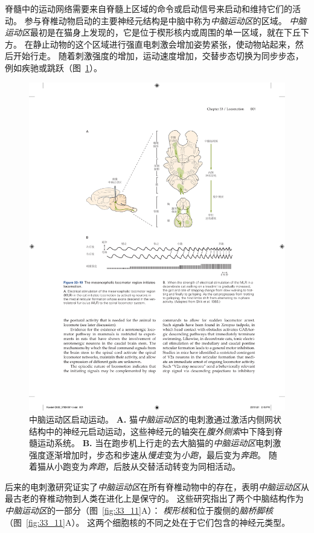 脊髓中的运动网络需要来自脊髓上区域的命令或启动信号来启动和维持它们的活动。
参与脊椎动物启动的主要神经元结构是中脑中称为\textit{中脑运动区}的区域。
\textit{中脑运动区}最初是在猫身上发现的，它是位于楔形核内或周围的单一区域，就在下丘下方。
在静止动物的这个区域进行强直电刺激会增加姿势紧张，使动物站起来，然后开始行走。
随着刺激强度的增加，运动速度增加，交替步态切换为同步步态，例如疾驰或跳跃（图~\ref{fig:33_10}）。


\begin{figure}[htbp]
	\centering
	\includegraphics[width=0.9\linewidth]{chap33/fig_33_10}
	\caption{中脑运动区启动运动。
		\textbf{A.} 猫\textit{中脑运动区}的电刺激通过激活内侧网状结构中的神经元启动运动，这些神经元的轴突在\textit{腹外侧索}中下降到脊髓运动系统。
		\textbf{B.} 当在跑步机上行走的去大脑猫的\textit{中脑运动区}电刺激强度逐渐增加时，步态和步速从\textit{慢走}变为\textit{小跑}，最后变为\textit{奔跑}。
		随着猫从小跑变为\textit{奔跑}，后肢从交替活动转变为同相活动。}
	\label{fig:33_10}
\end{figure}


后来的电刺激研究证实了\textit{中脑运动区}在所有脊椎动物中的存在，表明\textit{中脑运动区}从最古老的脊椎动物到人类在进化上是保守的。
这些研究指出了两个中脑结构作为\textit{中脑运动区}的一部分（图~\ref{fig:33_11}A）：
\textit{楔形核}和位于腹侧的\textit{脑桥脚核}（图~\ref{fig:33_11}A）。
这两个细胞核的不同之处在于它们包含的神经元类型。


